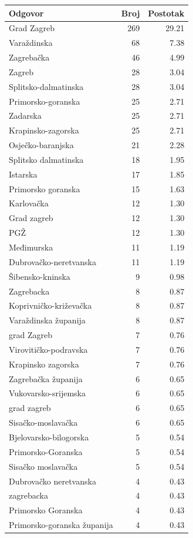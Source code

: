 \begin{tabular}{lrr}
\toprule
Odgovor & Broj & Postotak \\
\midrule
Grad Zagreb & 269 & 29.21 \\
Varaždinska & 68 & 7.38 \\
Zagrebačka & 46 & 4.99 \\
Zagreb & 28 & 3.04 \\
Splitsko-dalmatinska & 28 & 3.04 \\
Primorsko-goranska & 25 & 2.71 \\
Zadarska & 25 & 2.71 \\
Krapinsko-zagorska & 25 & 2.71 \\
Osječko-baranjska & 21 & 2.28 \\
Splitsko dalmatinska & 18 & 1.95 \\
Istarska & 17 & 1.85 \\
Primorsko goranska & 15 & 1.63 \\
Karlovačka & 12 & 1.30 \\
Grad zagreb & 12 & 1.30 \\
PGŽ & 12 & 1.30 \\
Međimurska & 11 & 1.19 \\
Dubrovačko-neretvanska & 11 & 1.19 \\
Šibensko-kninska & 9 & 0.98 \\
Zagrebacka & 8 & 0.87 \\
Koprivničko-križevačka & 8 & 0.87 \\
Varaždinska županija & 8 & 0.87 \\
grad Zagreb & 7 & 0.76 \\
Virovitičko-podravska & 7 & 0.76 \\
Krapinsko zagorska & 7 & 0.76 \\
Zagrebačka županija & 6 & 0.65 \\
Vukovarsko-srijemska & 6 & 0.65 \\
grad zagreb & 6 & 0.65 \\
Sisačko-moslavačka & 6 & 0.65 \\
Bjelovarsko-bilogorska & 5 & 0.54 \\
Primorsko-Goranska & 5 & 0.54 \\
Sisačko moslavačka & 5 & 0.54 \\
Dubrovačko neretvanska & 4 & 0.43 \\
zagrebacka & 4 & 0.43 \\
Primorsko Goranska & 4 & 0.43 \\
Primorsko-goranska županija & 4 & 0.43 \\

\end{tabular}
